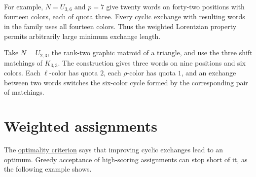 For example, $N=U_{3,6}$ and $p=7$ give twenty words on forty-two
positions with fourteen colors, each of quota three. Every cyclic
exchange with resulting words in the family uses all fourteen
colors. Thus the weighted Lorentzian property permits arbitrarily
large minimum exchange length.

\begin{example}
Take $N=U_{2,3}$, the rank-two graphic matroid of a triangle, and use the
three shift matchings of $K_{3,3}$. The construction gives three words on
nine positions and six colors. Each $\ell$-color has quota $2$, each
$\rho$-color has quota $1$, and an exchange between two words switches the
six-color cycle formed by the corresponding pair of matchings.
\end{example}

\section[weightedAssignments]{Weighted assignments}

The \href{exchange-graphs.htm#scoreOptimization}{optimality criterion}
says that improving cyclic exchanges lead to an optimum. Greedy acceptance
of high-scoring assignments can stop short of it, as the following example
shows.

